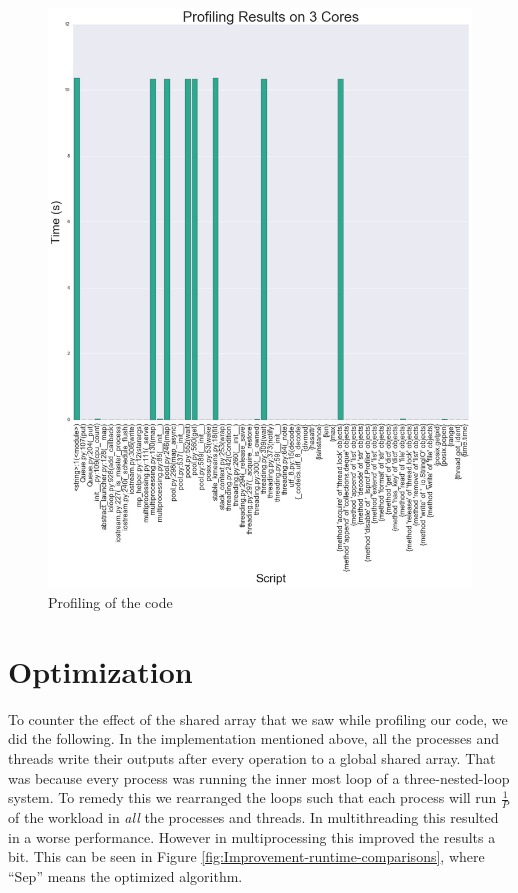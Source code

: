 \documentclass[10pt,twocolumn,letterpaper]{article}
\begin{document}
\begin{figure}[htbp] 
\begin{center}
\includegraphics[scale=0.45]{figure/Profiling.png}
\end{center}
\caption{\label{fig:Profiling-of-the}Profiling of the code}
\end{figure}


\section{Optimization}  \label{optimization}

To counter the effect of the shared array that we saw while profiling
our code, we did the following. In the implementation mentioned above,
all the processes and threads write their outputs after every operation
to a global shared array. That was because every process was running
the inner most loop of a three-nested-loop system. To remedy this
we rearranged the loops such that each process will run $\frac{1}{P}$
of the workload in \textit{all }the processes and threads. In multithreading
this resulted in a worse performance. However in multiprocessing this
improved the results a bit. This can be seen in Figure \ref{fig:Improvement-runtime-comparisons},
where ``Sep'' means the optimized algorithm.
\end{document}
